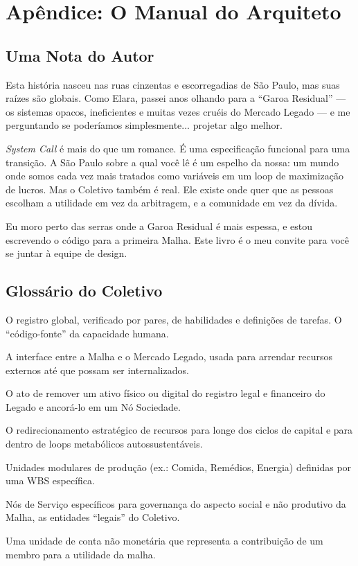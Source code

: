 
\chapter*{Apêndice: O Manual do Arquiteto}

\section*{Uma Nota do Autor}
Esta história nasceu nas ruas cinzentas e escorregadias de São Paulo, mas suas raízes são globais. Como Elara, passei anos olhando para a ``Garoa Residual'' --- os sistemas opacos, ineficientes e muitas vezes cruéis do Mercado Legado --- e me perguntando se poderíamos simplesmente... projetar algo melhor.

\textit{System Call} é mais do que um romance. É uma especificação funcional para uma transição. A São Paulo sobre a qual você lê é um espelho da nossa: um mundo onde somos cada vez mais tratados como variáveis em um loop de maximização de lucros. Mas o Coletivo também é real. Ele existe onde quer que as pessoas escolham a utilidade em vez da arbitragem, e a comunidade em vez da dívida.

Eu moro perto das serras onde a Garoa Residual é mais espessa, e estou escrevendo o código para a primeira Malha. Este livro é o meu convite para você se juntar à equipe de design.

\section*{Glossário do Coletivo}
\begin{description}[style=nextline, leftmargin=1em, font=\bfseries\headerfont\color{collectiveBlue}]
    \item[Corpo de Conhecimento (BoK)] O registro global, verificado por pares, de habilidades e definições de tarefas. O ``código-fonte'' da capacidade humana.
    \item[Fundo Comum] A interface entre a Malha e o Mercado Legado, usada para arrendar recursos externos até que possam ser internalizados.
    \item[Dissociação] O ato de remover um ativo físico ou digital do registro legal e financeiro do Legado e ancorá-lo em um Nó Sociedade.
    \item[Sangria] O redirecionamento estratégico de recursos para longe dos ciclos de capital e para dentro de loops metabólicos autossustentáveis.
    \item[Nós de Serviço] Unidades modulares de produção (ex.: Comida, Remédios, Energia) definidas por uma WBS específica.
    \item[Nós Sociedade] Nós de Serviço específicos para governança do aspecto social e não produtivo da Malha, as entidades ``legais'' do Coletivo.
    \item[Valor] Uma unidade de conta não monetária que representa a contribuição de um membro para a utilidade da malha.
\end{description}

